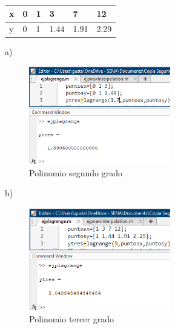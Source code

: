 \documentclass{article}
\begin{document}
\begin{table}[h!]
    \begin{tabular}{l|l|l|l|l|l}
        \hline    
        \multicolumn{1}{|p{30.865313pt}}{\raggedright x} & \multicolumn{1}{|p{31.618126pt}}{\raggedright 0} & \multicolumn{1}{|p{31.618126pt}}{\raggedright 1} & \multicolumn{1}{|p{33.876564pt}}{\raggedright 3}    & \multicolumn{1}{|p{37.640625pt}}{\raggedright 7}    & \multicolumn{1}{|p{33.876564pt}|}{\raggedright 12}   \\
        \hline
        \multicolumn{1}{|p{30.865313pt}}{\raggedright y} & \multicolumn{1}{|p{31.618126pt}}{\raggedright 0} & \multicolumn{1}{|p{31.618126pt}}{\raggedright 1} & \multicolumn{1}{|p{33.876564pt}}{\raggedright 1.44} & \multicolumn{1}{|p{37.640625pt}}{\raggedright 1.91} & \multicolumn{1}{|p{33.876564pt}|}{\raggedright 2.29} \\
        \hline
    \end{tabular}
\end{table}
a)
\begin{figure}[H]
    \centering
    \includegraphics[width=0.55\textwidth]{35a.png}
    \caption[short]{Polinomio segundo grado}
\end{figure}
b)
\begin{figure}[H]
    \centering
    \includegraphics[width=0.55\textwidth]{35b.png}
    \caption[short]{Polinomio tercer grado}
\end{figure}
\end{document}
